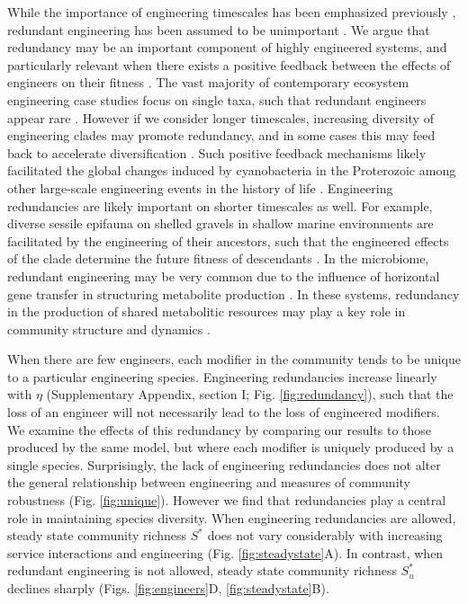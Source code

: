 \documentclass[twocolumn,preprintnumbers,amsmath,amssymb,superscriptaddress,linenumbers]{revtex4-1}
\begin{document}
While the importance of engineering timescales has been emphasized previously \cite{Hastings2007}, redundant engineering has been assumed to be unimportant \cite{Lawton1994}.
We argue that redundancy may be an important component of highly engineered systems, and particularly relevant when there exists a positive feedback between the effects of engineers on their fitness \cite{Cuddington2004}.
The vast majority of contemporary ecosystem engineering case studies focus on single taxa, such that redundant engineers appear rare \cite{Lawton1994}.
However if we consider longer timescales, increasing diversity of engineering clades may promote redundancy, and in some cases this may feed back to accelerate diversification \cite{OdlingSmee2013b}.
Such positive feedback mechanisms likely facilitated the global changes induced by cyanobacteria in the Proterozoic \cite{Erwin2008,Schirrmeister2013} among other large-scale engineering events in the history of life \cite{Erwin2008}.
Engineering redundancies are likely important on shorter timescales as well.
For example, diverse sessile epifauna on shelled gravels in shallow marine environments are facilitated by the engineering of their ancestors, such that the engineered effects of the clade determine the future fitness of descendants \cite{Kidwell1986}.
In the microbiome, redundant engineering may be very common due to the influence of horizontal gene transfer in structuring metabolite production \cite{Polz2013}.
In these systems, redundancy in the production of shared metabolitic resources may play a key role in community structure and dynamics \cite{Kallus2017,Muscarella2017}.




When there are few engineers, each modifier in the community tends to be unique to a particular engineering species.
Engineering redundancies increase linearly with $\eta$ (Supplementary Appendix, section I; Fig. \ref{fig:redundancy}), such that the loss of an engineer will not necessarily lead to the loss of engineered modifiers. %
We examine the effects of this redundancy by comparing our results to those produced by the same model, but where each modifier is uniquely produced by a single species.
Surprisingly, the lack of engineering redundancies does not alter the general relationship between engineering and measures of community robustness (Fig. \ref{fig:unique}).
However we find that redundancies play a central role in maintaining species diversity.
When engineering redundancies are allowed, steady state community richness $S^*$ does not vary considerably with increasing service interactions and engineering (Fig. \ref{fig:steadystate}A).
In contrast, when redundant engineering is not allowed, steady state community richness $S^*_u$ declines sharply (Figs. \ref{fig:engineers}D, \ref{fig:steadystate}B).
\end{document}
